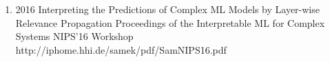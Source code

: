 {\begin{enumerate}
        \item {}
                                {2016}
                                {Interpreting the Predictions of Complex ML Models by Layer-wise Relevance Propagation}
                                {Proceedings of the Interpretable ML for Complex Systems NIPS'16 Workshop}
                                {}
                                {http://iphome.hhi.de/samek/pdf/SamNIPS16.pdf}

    \end{enumerate}
}
